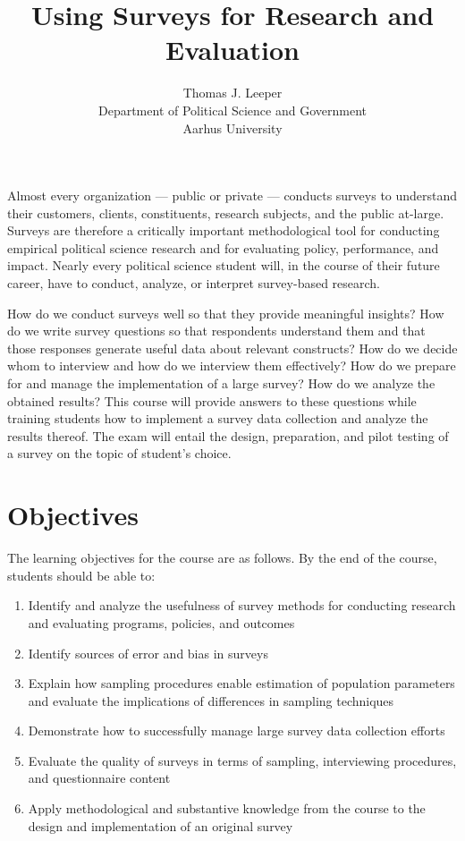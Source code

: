\documentclass[11pt,a4paper]{article}
\title{Using Surveys for Research and Evaluation}
\author{Thomas J. Leeper\\
Department of Political Science and Government\\
Aarhus University}
\begin{document}
\nobibliography*

\maketitle

\faketableofcontents


Almost every organization --- public or private --- conducts surveys to understand their customers, clients, constituents, research subjects, and the public at-large. Surveys are therefore a critically important methodological tool for conducting empirical political science research and for evaluating policy, performance, and impact. Nearly every political science student will, in the course of their future career, have to conduct, analyze, or interpret survey-based research.

How do we conduct surveys well so that they provide meaningful insights? How do we write survey questions so that respondents understand them and that those responses generate useful data about relevant constructs? How do we decide whom to interview and how do we interview them effectively? How do we prepare for and manage the implementation of a large survey? How do we analyze the obtained results? This course will provide answers to these questions while training students how to implement a survey data collection and analyze the results thereof. The exam will entail the design, preparation, and pilot testing of a survey on the topic of student's choice.

\section{Objectives}
The learning objectives for the course are as follows. By the end of the course, students should be able to:

\begin{enumerate}
\item Identify and analyze the usefulness of survey methods for conducting research and evaluating programs, policies, and outcomes
\item Identify sources of error and bias in surveys
\item Explain how sampling procedures enable estimation of population parameters and evaluate the implications of differences in sampling techniques
\item Demonstrate how to successfully manage large survey data collection efforts
\item Evaluate the quality of surveys in terms of sampling, interviewing procedures, and questionnaire content 
\item Apply methodological and substantive knowledge from the course to the design and implementation of an original survey
\end{enumerate}
\end{document}
